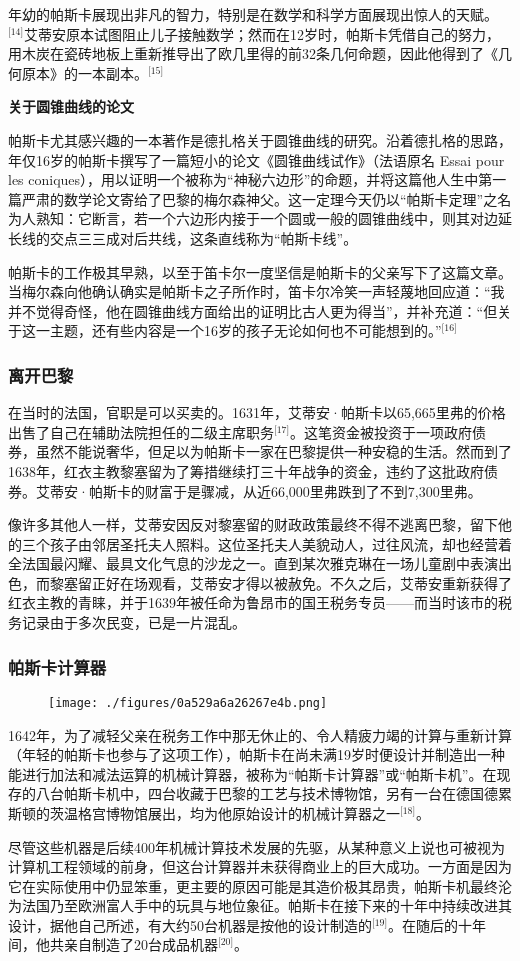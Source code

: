 年幼的帕斯卡展现出非凡的智力，特别是在数学和科学方面展现出惊人的天赋。\(^\text{[14]}\)艾蒂安原本试图阻止儿子接触数学；然而在12岁时，帕斯卡凭借自己的努力，用木炭在瓷砖地板上重新推导出了欧几里得的前32条几何命题，因此他得到了《几何原本》的一本副本。\(^\text{[15]}\)

\textbf{关于圆锥曲线的论文}

帕斯卡尤其感兴趣的一本著作是德扎格关于圆锥曲线的研究。沿着德扎格的思路，年仅16岁的帕斯卡撰写了一篇短小的论文《圆锥曲线试作》（法语原名 Essai pour les coniques），用以证明一个被称为“神秘六边形”的命题，并将这篇他人生中第一篇严肃的数学论文寄给了巴黎的梅尔森神父。这一定理今天仍以“帕斯卡定理”之名为人熟知：它断言，若一个六边形内接于一个圆或一般的圆锥曲线中，则其对边延长线的交点三三成对后共线，这条直线称为“帕斯卡线”。

帕斯卡的工作极其早熟，以至于笛卡尔一度坚信是帕斯卡的父亲写下了这篇文章。当梅尔森向他确认确实是帕斯卡之子所作时，笛卡尔冷笑一声轻蔑地回应道：“我并不觉得奇怪，他在圆锥曲线方面给出的证明比古人更为得当”，并补充道：“但关于这一主题，还有些内容是一个16岁的孩子无论如何也不可能想到的。”\(^\text{[16]}\)
\subsubsection{离开巴黎}
在当时的法国，官职是可以买卖的。1631年，艾蒂安·帕斯卡以65,665里弗的价格出售了自己在辅助法院担任的二级主席职务\(^\text{[17]}\)。这笔资金被投资于一项政府债券，虽然不能说奢华，但足以为帕斯卡一家在巴黎提供一种安稳的生活。然而到了1638年，红衣主教黎塞留为了筹措继续打三十年战争的资金，违约了这批政府债券。艾蒂安·帕斯卡的财富于是骤减，从近66,000里弗跌到了不到7,300里弗。

像许多其他人一样，艾蒂安因反对黎塞留的财政政策最终不得不逃离巴黎，留下他的三个孩子由邻居圣托夫人照料。这位圣托夫人美貌动人，过往风流，却也经营着全法国最闪耀、最具文化气息的沙龙之一。直到某次雅克琳在一场儿童剧中表演出色，而黎塞留正好在场观看，艾蒂安才得以被赦免。不久之后，艾蒂安重新获得了红衣主教的青睐，并于1639年被任命为鲁昂市的国王税务专员——而当时该市的税务记录由于多次民变，已是一片混乱。
\subsubsection{帕斯卡计算器}
\begin{figure}[ht]
\centering
\texttt{[image: ./figures/0a529a6a26267e4b.png]}
\caption{} \label{fig_BLSpsk_2}
\end{figure}
1642年，为了减轻父亲在税务工作中那无休止的、令人精疲力竭的计算与重新计算（年轻的帕斯卡也参与了这项工作），帕斯卡在尚未满19岁时便设计并制造出一种能进行加法和减法运算的机械计算器，被称为“帕斯卡计算器”或“帕斯卡机”。在现存的八台帕斯卡机中，四台收藏于巴黎的工艺与技术博物馆，另有一台在德国德累斯顿的茨温格宫博物馆展出，均为他原始设计的机械计算器之一\(^\text{[18]}\)。

尽管这些机器是后续400年机械计算技术发展的先驱，从某种意义上说也可被视为计算机工程领域的前身，但这台计算器并未获得商业上的巨大成功。一方面是因为它在实际使用中仍显笨重，更主要的原因可能是其造价极其昂贵，帕斯卡机最终沦为法国乃至欧洲富人手中的玩具与地位象征。帕斯卡在接下来的十年中持续改进其设计，据他自己所述，有大约50台机器是按他的设计制造的\(^\text{[19]}\)。在随后的十年间，他共亲自制造了20台成品机器\(^\text{[20]}\)。
